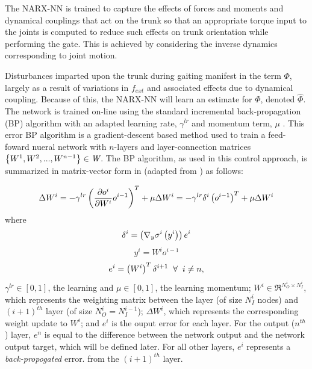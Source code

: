 			The NARX-NN is trained to capture the effects of forces and moments and dynamical couplings that act on the trunk
			so that an appropriate torque input to the joints is computed to reduce such effects on trunk orientation while performing the gate. This is achieved by considering the inverse dynamics corresponding to joint motion.

			Disturbances imparted upon the trunk during gaiting manifest in the term $\Phi$, largely as a result of variations in $f_{ext}$ and associated effects due to dynamical coupling. Because of this, the NARX-NN will learn an estimate for $\Phi$, denoted $\hat{\Phi}$. The network is trained on-line using the standard incremental back-propagation (BP) algorithm with an adapted learning rate, $\gamma^{lr}$ and momentum term, $\mu$ \cite{Rumelhart1988,Rumelhart1995}. This error BP algorithm is a gradient-descent based method used to train a feed-foward nueral network with $n$-layers and layer-connection matrices $\left\{W^{1},W^{2},...,W^{n-1}\right\} \in \emph{W}$. The BP algorithm, as used in this control approach, is summarized in matrix-vector form in (adapted from \cite{Rojas1996ch7}) as follows: 

			\begin{equation}
				\Delta W^{i} =
					-\gamma^{lr} \left( \frac{ \partial o^{i} }{\partial {W^{i} } }  o^{i-1} \right)^{T}  + \mu \Delta W^{i} = 
					-\gamma^{lr} \delta^{i} \left(o^{i-1}\right)^{T}  + \mu \Delta W^{i}
				\label{eq::bp_weight_update}
			\end{equation} 
			where
			\begin{equation*}
				\delta^{i} = \left( \nabla_{y} \sigma^{i}\left(y^{i}\right) \right) e^{i}
				\label{eq::bp_error}
			\end{equation*}
			\begin{equation*}
				y^{i} = W^{i} o^{i-1}
				\label{eq::bp_error}
			\end{equation*}
			\begin{equation*}
				e^{i} =  \left( W^{i} \right)^{T} \delta^{i+1} \hspace{2mm} \forall \hspace{2mm} i\neq n,
			\end{equation*}
			$\gamma^{lr} \in [0,1]$, the learning and  $\mu \in [0,1]$, the learning momentum; $W^{i} \in \Re^{N_{O}^{i}\times N_{I}^{i}}$, which represents the weighting matrix between the \Ith layer (of size $N_{I}^{i}$ nodes) and $(i+1)^{th}$ layer (of size $N_{O}^{i}=N_{I}^{i-1}$); $\Delta W^{i}$, which represents the corresponding weight update to $W^{i}$; and $e^{i}$ is the ouput error for each \Ith layer. For the output ($n^{th}$) layer, $e^{n}$ is equal to the difference between the network output and the network output target, which will be defined later. For all other layers, $e^{i}$ represents a \emph{back-propogated} error. from the $(i+1)^{th}$ layer.


